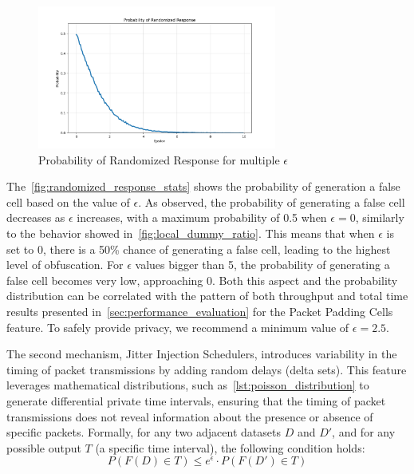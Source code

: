 \begin{figure}
    \centering
    \includegraphics[width=0.7\textwidth]{Chapters/Figures/Plots/rr_stats.png}
    \caption{Probability of Randomized Response for multiple $\epsilon$}\label{fig:randomized_response_stats}
\end{figure}

The~\autoref{fig:randomized_response_stats} shows the probability of generation a false cell based on the value of $\epsilon$. As observed, the probability of generating a false cell decreases as $\epsilon$ increases, with a maximum probability of 0.5 when $\epsilon = 0$, similarly to the behavior showed in~\autoref{fig:local_dummy_ratio}. This means that when $\epsilon$ is set to 0, there is a 50\% chance of generating a false cell, leading to the highest level of obfuscation. For $\epsilon$ values bigger than 5, the probability of generating a false cell becomes very low, approaching 0. Both this aspect and the probability distribution can be correlated with the pattern of both throughput and total time results presented in~\autoref{sec:performance_evaluation} for the Packet Padding Cells feature. To safely provide privacy, we recommend a minimum value of $\epsilon = 2.5$.


The second mechanism, Jitter Injection Schedulers, introduces variability in the timing of packet transmissions by adding random delays (delta sets). This feature leverages mathematical distributions, such as~\autoref{lst:poisson_distribution} to generate differential private time intervals, ensuring that the timing of packet transmissions does not reveal information about the presence or absence of specific packets. Formally, for any two adjacent datasets $D$ and $D'$, and for any possible output $T$ (a specific time interval), the following condition holds:
\[P(F(D) \in T) \leq e^{\epsilon} \cdot P(F(D') \in T)\]

